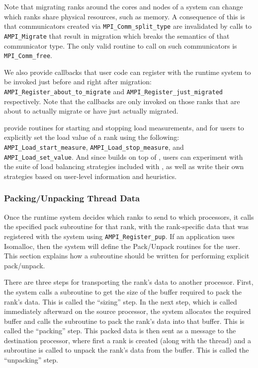 \documentclass[10pt]{article}
\begin{document}
Note that migrating ranks around the cores and nodes of a system can change which
ranks share physical resources, such as memory. A consequence of this is that communicators created
via \texttt{MPI\_Comm\_split\_type} are invalidated by calls to \texttt{AMPI\_Migrate} that result
in migration which breaks the semantics of that communicator type. The only valid routine to call on
such communicators is \texttt{MPI\_Comm\_free}.

We also provide callbacks that user code can register with the runtime system
to be invoked just before and right after migration:
\texttt{AMPI\_Register\_about\_to\_migrate} and
\texttt{AMPI\_Register\_just\_migrated} respectively. Note that the callbacks
are only invoked on those ranks that are about to actually migrate or have
just actually migrated.

\ampi{} provide routines for starting and stopping load measurements, and for
users to explicitly set the load value of a rank using the following:
\texttt{AMPI\_Load\_start\_measure}, \texttt{AMPI\_Load\_stop\_measure}, and
\texttt{AMPI\_Load\_set\_value}. And since \ampi{} builds on top of \charmpp{},
users can experiment with the suite of load balancing strategies included with
\charmpp{}, as well as write their own strategies based on user-level
information and heuristics.

\subsubsection{Packing/Unpacking Thread Data}

Once the \ampi{} runtime system decides which ranks to send to which
processors, it calls the specified pack subroutine for that rank, with the
rank-specific data that was registered with the system using
\texttt{AMPI\_Register\_pup}. If an \ampi{} application uses Isomalloc, then
the system will define the Pack/Unpack routines for the user. This section
explains how a subroutine should be written for performing explicit pack/unpack.

There are three steps for transporting the rank's data to another processor.
First, the system calls a subroutine to get the size of the buffer required to
pack the rank's data. This is called the ``sizing'' step. In the next step,
which is called immediately afterward on the source processor, the system
allocates the required buffer and calls the subroutine to pack the rank's data
into that buffer. This is called the ``packing'' step. This packed data is then
sent as a message to the destination processor, where first a rank is created
(along with the thread) and a subroutine is called to unpack the rank's data
from the buffer. This is called the ``unpacking'' step.
\end{document}
